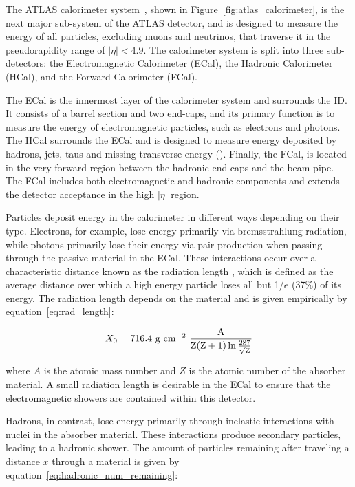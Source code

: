 The ATLAS calorimeter system~\cite{atlas_calorimeter_tdr}, shown in Figure~\ref{fig:atlas_calorimeter}, is the next major sub-system of the ATLAS detector, and is designed to measure the energy of all particles, excluding muons and neutrinos, that traverse it in the pseudorapidity range of $|\eta| < 4.9$\@. The calorimeter system is split into three sub-detectors: the Electromagnetic Calorimeter (ECal), the Hadronic Calorimeter (HCal), and the Forward Calorimeter (FCal). 

The ECal is the innermost layer of the calorimeter system and surrounds the ID\@. It consists of a barrel section and two end-caps, and its primary function is to measure the energy of electromagnetic particles, such as electrons and photons. The HCal surrounds the ECal and is designed to measure energy deposited by hadrons, jets, taus and missing transverse energy (\met). Finally, the FCal, is located in the very forward region between the hadronic end-caps and the beam pipe. The FCal includes both electromagnetic and hadronic components and extends the detector acceptance in the high $|\eta|$ region.

Particles deposit energy in the calorimeter in different ways depending on their type. Electrons, for example, lose energy primarily via bremsstrahlung radiation, while photons primarily lose their energy via pair production when passing through the passive material in the ECal. These interactions occur over a characteristic distance known as the radiation length \radlength, which is defined as the average distance over which a high energy particle loses all but 1/$e$ (37\%) of its energy. The radiation length depends on the material and is given empirically by equation~\ref{eq:rad_length}:

\begin{equation}
    \centering
    X_{0} = 716.4 \ \mathrm{g \ cm^{-2} \ \frac{A}{Z (Z+1) \ln{\frac{287}{\sqrt{Z}}}}}
    \label{eq:rad_length}
\end{equation}

\noindent{}where $A$ is the atomic mass number and $Z$ is the atomic number of the absorber material. A small radiation length is desirable in the ECal to ensure that the electromagnetic showers are contained within this detector.

Hadrons, in contrast, lose energy primarily through inelastic interactions with nuclei in the absorber material. These interactions produce secondary particles, leading to a hadronic shower. The amount of particles remaining after traveling a distance $x$ through a material is given by equation~\ref{eq:hadronic_num_remaining}:

